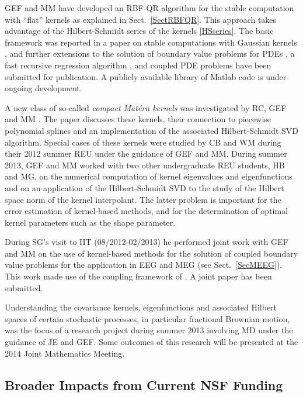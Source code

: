 \documentclass[11pt]{NSFamsart}
\newcommand{\Matlab}{{\sc Matlab}\xspace}
\begin{document}
GEF and MM have developed an RBF-QR algorithm for the stable computation with ``flat'' kernels as explained in Sect.~\ref{SectRBFQR}. This approach takes advantage of the Hilbert-Schmidt series of the kernels \eqref{HSseries}. The basic framework was reported in a paper on stable computations with Gaussian kernels \citep{FMcC12}, and further extensions to the solution of boundary value problems for PDEs \citep{McCourt13}, a fast recursive regression algorithm \citep{McCourt13b}, and coupled PDE problems \citep{McCF13} have been submitted for publication. A publicly available library of \Matlab code \citep{McCFBG13} is under ongoing development.

A new class of so-called \emph{compact Mat\'ern kernels} was investigated by RC, GEF and MM \citep{CFMcC13}. The paper discusses these kernels, their connection to piecewise polynomial splines and an implementation of the associated Hilbert-Schmidt SVD algorithm. Special cases of these kernels were studied by CB and WM during their 2012 summer REU under the guidance of GEF and MM. During summer 2013, GEF and MM worked with two other undergraduate REU students, HB and MG, on the numerical computation of kernel eigenvalues and eigenfunctions and on an application of the Hilbert-Schmidt SVD to the study of the Hilbert space norm of the kernel interpolant. The latter problem is important for the error estimation of kernel-based methods, and for the determination of optimal kernel parameters such as the shape parameter.

During SG's visit to IIT (08/2012-02/2013) he performed joint work with GEF and MM on the use of kernel-based methods for the solution of coupled boundary value problems for the application in EEG and MEG (see Sect.~\ref{SecMEEG}). This work made use of the coupling framework of \cite{McCF13}. A joint paper \citep{AFFGM13} has been submitted.

Understanding the covariance kernels, eigenfunctions and associated Hilbert spaces of certain stochastic processes, in particular fractional Brownian motion, was the focus of a research project during summer 2013 involving MD under the guidance of JE and GEF. Some outcomes of this research will be presented at the 2014 Joint Mathematics Meeting.

\subsection{Broader Impacts from Current NSF Funding}
\end{document}
